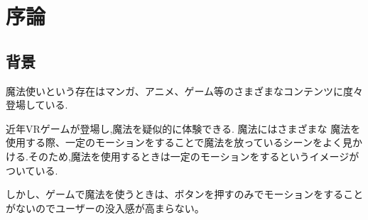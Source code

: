 \chapter{序論}
\section{背景}
魔法使いという存在はマンガ、アニメ、ゲーム等のさまざまなコンテンツに度々登場している.

近年VRゲームが登場し,魔法を疑似的に体験できる.
魔法にはさまざまな
魔法を使用する際、一定のモーションをすることで魔法を放っているシーンをよく見かける.そのため,魔法を使用するときは一定のモーションをするというイメージがついている.

しかし、ゲームで魔法を使うときは、ボタンを押すのみでモーションをすることがないのでユーザーの没入感が高まらない。



\begin{comment}
    \textblockcolour{pink}
    \begin{textblock}{4}(16, 1)
        \noindent
        【5】目次に続いて本文
    \end{textblock}
    
    \textblockcolour{PowderBlue}
    \begin{textblock}{12}(6, 6)
    \noindent
    以降、1章 (chapter)、1.1節 (section)、1.1.1項 (subsection) と呼ぶ
    \end{textblock}
    
    \begin{textblock}{6}(8, 12)
    1章の最初の節が1.1
    
    1.1節の最初の項が1.1.1
    \end{textblock}
    
    
    \begin{textblock}{2}(0.5, 13.5)
    \noindent
    段落1行目を字下げをする
    \end{textblock}
    
    \begin{textblock}{2}(0.5, 18)
    \noindent
    内容の区切りに合わせて段落を分ける
    \end{textblock}
    
    \begin{textblock}{6}(11, 26.5)
        本文の開始ページを1とする
    \end{textblock}
\end{comment}

